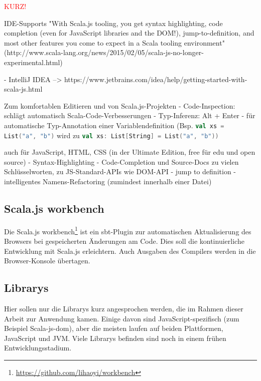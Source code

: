 \documentclass[a4paper, 12pt, hidelinks, listof=totoc, listoftables=totoc, bibliography=totoc]{scrreprt}
\newcommand{\scala}[1]{\lstinline[language=Scala, style=inline]|#1|}
\newcommand{\TODO}[1]{\textcolor{red}{#1}\newline}
\begin{document}
\TODO{KURZ!}

\ac{IDE}-Supports
  "With Scala.js tooling, you get syntax highlighting, code completion (even for JavaScript libraries and the \ac{DOM}!), jump-to-definition, and most other features you come to expect in a Scala tooling environment" (http://www.scala-lang.org/news/2015/02/05/scala-js-no-longer-experimental.html)

  - IntelliJ IDEA  -->  https://www.jetbrains.com/idea/help/getting-started-with-scala-js.html

    Zum komfortablen Editieren und von Scala.js-Projekten
    - Code-Inspection: schlägt automatisch Scala-Code-Verbesserungen
    - Typ-Inferenz: Alt + Enter - für automatische Typ-Annotation einer Variablendefinition (Bsp. \scala{val xs = List("a", "b")} wird zu \scala{val xs: List[String] = List("a", "b"))}

    auch für JavaScript, \ac{HTML}, \ac{CSS} (in der Ultimate Edition, free für edu und open source)
      - Syntax-Highlighting
      - Code-Completion und Source-Docs zu vielen Schlüsselworten, zu JS-Standard-\ac{API}s wie \ac{DOM}-\ac{API}
      - jump to definition
      - intelligentes Namens-Refactoring (zumindest innerhalb einer Datei)





\subsection{Scala.js workbench}

Die Scala.js workbench\footnote{\url{https://github.com/lihaoyi/workbench}} ist ein sbt-Plugin zur automatischen Aktualisierung des Browsers 
bei gespeicherten Änderungen am Code. Dies soll die kontinuierliche Entwicklung mit Scala.js erleichtern. Auch Ausgaben des Compilers werden in die Browser-Konsole übertagen.


\subsection{Librarys}

Hier sollen nur die Librarys kurz angesprochen werden, die im Rahmen dieser Arbeit zur Anwendung kamen. Einige davon sind JavaScript-spezifisch (zum Beispiel Scala-js-dom), aber die meisten laufen auf beiden Plattformen, JavaScript und \ac{JVM}. Viele Librarys befinden sind noch in einem frühen Entwicklungsstadium.
\end{document}
